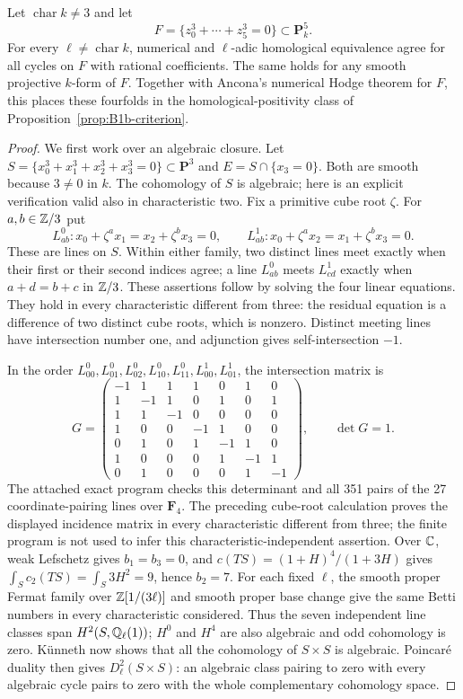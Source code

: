 \begin{theorem}
\label{B1b-fermat}
Let $\operatorname{char}k\ne3$ and let
\[
 F=\{z_0^3+\cdots+z_5^3=0\}\subset\mathbf P^5_k.
\]
For every $\ell\ne\operatorname{char}k$, numerical and $\ell$-adic
homological equivalence agree for all cycles on $F$ with rational
coefficients. The same holds for any smooth projective $k$-form of $F$.
Together with Ancona's numerical Hodge theorem for $F$, this places
these fourfolds in the homological-positivity class of
Proposition~\ref{prop:B1b-criterion}.
\end{theorem}
\begin{proof}
We first work over an algebraic closure. Let
$S=\{x_0^3+x_1^3+x_2^3+x_3^3=0\}\subset\mathbf P^3$ and
$E=S\cap\{x_3=0\}$. Both are smooth because $3\ne0$ in $k$.
The cohomology of $S$ is algebraic; here is an explicit verification
valid also in characteristic two. Fix a primitive cube root $\zeta$.
For $a,b\in{\ensuremath{\mathbb{Z}}}/3$ put
\[
 L^0_{ab}: x_0+\zeta^a x_1=x_2+\zeta^b x_3=0,
 \qquad
 L^1_{ab}: x_0+\zeta^a x_2=x_1+\zeta^b x_3=0.
\]
These are lines on $S$. Within either family, two distinct lines meet
exactly when their first or their second indices agree; a line
$L^0_{ab}$ meets $L^1_{cd}$ exactly when $a+d=b+c$ in ${\mathbb{Z}}/3$.
These assertions follow by solving the four linear equations. They
hold in every characteristic different from three: the residual
equation is a difference of two distinct cube roots, which is nonzero.
Distinct meeting lines have intersection number one, and adjunction
gives self-intersection $-1$.

In the order
$L^0_{00},L^0_{01},L^0_{02},L^0_{10},L^0_{11},L^1_{00},L^1_{01}$,
the intersection matrix is
\[
 G=\begin{pmatrix}
 -1&1&1&1&0&1&0\\
 1&-1&1&0&1&0&1\\
 1&1&-1&0&0&0&0\\
 1&0&0&-1&1&0&0\\
 0&1&0&1&-1&1&0\\
 1&0&0&0&1&-1&1\\
 0&1&0&0&0&1&-1
 \end{pmatrix},\qquad \det G=1.
\]
The attached exact program checks this determinant and all 351 pairs
of the 27 coordinate-pairing lines over $\mathbf F_4$.
The preceding cube-root calculation proves the displayed incidence
matrix in every characteristic different from three; the finite program
is not used to infer this characteristic-independent assertion.
Over ${\mathbb{C}}$, weak Lefschetz gives
$b_1=b_3=0$, and
$c(TS)=(1+H)^4/(1+3H)$ gives
$\int_Sc_2(TS)=\int_S3H^2=9$, hence $b_2=7$.
For each fixed $\ell$, the smooth proper Fermat family over
${\mathbb{Z}}[1/(3\ell)]$ and smooth proper base change give the same Betti
numbers in every characteristic considered.
Thus the seven independent line classes span $H^2(S,{\mathbb{Q}}_\ell(1))$;
$H^0$ and $H^4$ are also algebraic and odd cohomology is zero.
K\"unneth now shows that all the cohomology of $S\times S$ is
algebraic. Poincar\'e duality then gives $D^2_\ell(S\times S)$:
an algebraic class pairing to zero with every algebraic cycle pairs
to zero with the whole complementary cohomology space.


\end{proof}
